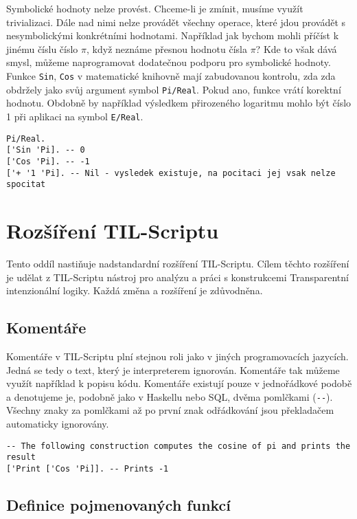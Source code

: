 Symbolické hodnoty nelze provést. Chceme-li je zmínit, musíme využít trivializaci. Dále nad nimi
nelze provádět všechny operace, které jdou provádět s nesymbolickými konkrétními hodnotami.
Například jak bychom mohli příčíst k jinému číslu číslo $\pi$, když neznáme přesnou hodnotu čísla
$\pi$? Kde to však dává smysl, můžeme naprogramovat dodatečnou podporu pro symbolické hodnoty.
Funkce \lstinline{Sin}, \lstinline{Cos} v matematické knihovně mají zabudovanou kontrolu, zda
zda obdržely jako svůj argument symbol \lstinline{Pi/Real}. Pokud ano, funkce vrátí korektní
hodnotu. Obdobně by například výsledkem přirozeného logaritmu mohlo být číslo 1 při aplikaci
na symbol \lstinline{E/Real}.

\begin{lstlisting}[caption={Příklad využití symbolických hodnot}]
Pi/Real.
['Sin 'Pi]. -- 0
['Cos 'Pi]. -- -1
['+ '1 'Pi]. -- Nil - vysledek existuje, na pocitaci jej vsak nelze spocitat
\end{lstlisting}

\section{Rozšíření TIL-Scriptu}

Tento oddíl nastiňuje nadstandardní rozšíření TIL-Scriptu. Cílem těchto rozšíření je udělat
z TIL-Scriptu nástroj pro analýzu a práci s konstrukcemi Transparentní intenzionální logiky. Každá
změna a rozšíření je zdůvodněna.

\subsection{Komentáře}

Komentáře v TIL-Scriptu plní stejnou roli jako v jiných programovacích jazycích. Jedná se tedy
o text, který je interpreterem ignorován. Komentáře tak můžeme využít například k popisu kódu.
Komentáře existují pouze v jednořádkové podobě a denotujeme je, podobně jako v Haskellu nebo SQL,
dvěma pomlčkami (\lstinline{--}). Všechny znaky za pomlčkami až po první znak odřádkování jsou
překladačem automaticky ignorovány.

\begin{lstlisting}[caption={Příklad využití komentářů}]
-- The following construction computes the cosine of pi and prints the result
['Print ['Cos 'Pi]]. -- Prints -1
\end{lstlisting}

\subsection{Definice pojmenovaných funkcí} \label{fn-definition}


